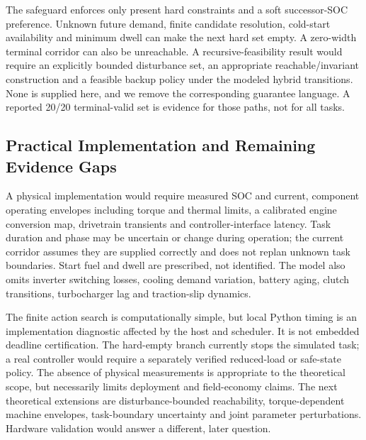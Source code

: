 \documentclass[energies,article,submit,moreauthors]{Definitions/mdpi}
\begin{document}
The safeguard enforces only present hard constraints and a soft successor-SOC preference. Unknown future demand, finite candidate resolution, cold-start availability and minimum dwell can make the next hard set empty. A zero-width terminal corridor can also be unreachable. A recursive-feasibility result would require an explicitly bounded disturbance set, an appropriate reachable/invariant construction and a feasible backup policy under the modeled hybrid transitions. None is supplied here, and we remove the corresponding guarantee language. A reported 20/20 terminal-valid set is evidence for those paths, not for all tasks.

\subsection{Practical Implementation and Remaining Evidence Gaps}
A physical implementation would require measured SOC and current, component operating envelopes including torque and thermal limits, a calibrated engine conversion map, drivetrain transients and controller-interface latency. Task duration and phase may be uncertain or change during operation; the current corridor assumes they are supplied correctly and does not replan unknown task boundaries. Start fuel and dwell are prescribed, not identified. The model also omits inverter switching losses, cooling demand variation, battery aging, clutch transitions, turbocharger lag and traction-slip dynamics.

The finite action search is computationally simple, but local Python timing is an implementation diagnostic affected by the host and scheduler. It is not embedded deadline certification. The hard-empty branch currently stops the simulated task; a real controller would require a separately verified reduced-load or safe-state policy. The absence of physical measurements is appropriate to the theoretical scope, but necessarily limits deployment and field-economy claims. The next theoretical extensions are disturbance-bounded reachability, torque-dependent machine envelopes, task-boundary uncertainty and joint parameter perturbations. Hardware validation would answer a different, later question.
\end{document}
